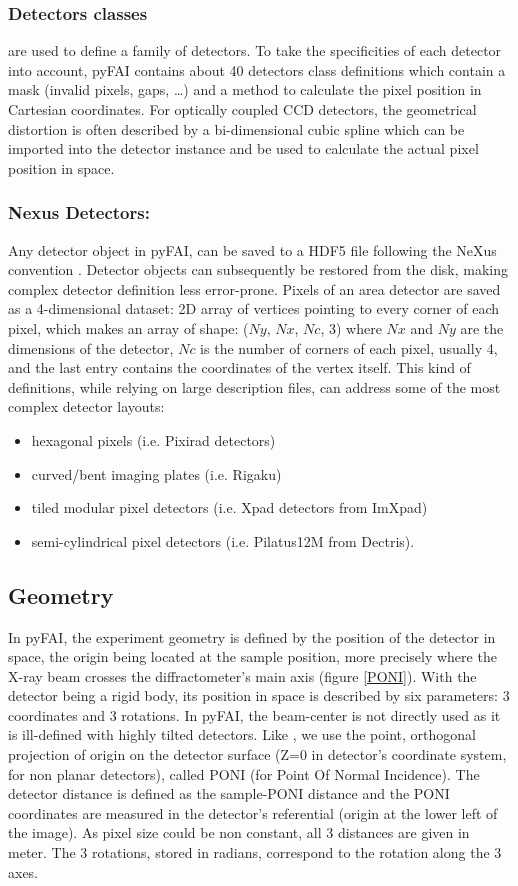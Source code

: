 \documentclass[preprint]{iucr}
\begin{document}
\subsubsection{Detectors classes} are used to define a family of detectors.
To take the specificities of each detector into account, pyFAI contains about
40 detectors class definitions which contain a mask (invalid pixels,
gaps, \ldots) and a method to calculate the pixel position in Cartesian coordinates.
For optically coupled CCD detectors, the geometrical distortion is often
described by a bi-dimensional cubic spline which can be imported into
the detector instance and be used to calculate the actual pixel position in space.

\subsubsection{Nexus Detectors:}
Any detector object in pyFAI, can be saved to a HDF5 file following the NeXus
 convention \cite{nexus}.
Detector objects can subsequently be restored from the disk, making
complex detector definition less error-prone.
Pixels of an area detector are saved as a 4-dimensional dataset: 2D
array of vertices pointing to every corner of each pixel, which makes an array
of shape: ($Ny$, $Nx$, $Nc$, 3) where $Nx$ and $Ny$ are the dimensions of the
detector, $Nc$ is the number of corners of each pixel, usually 4, and the last
entry contains the coordinates of the vertex itself.
This kind of definitions, while relying on large description files,
can address some of the most complex detector layouts:
\begin{itemize}
  \item hexagonal pixels (i.e. Pixirad detectors)
  \item curved/bent imaging plates (i.e. Rigaku)
  \item tiled modular pixel detectors (i.e. Xpad detectors from ImXpad)
  \item semi-cylindrical pixel detectors (i.e. Pilatus12M from Dectris).
\end{itemize}

\subsection{Geometry}
In pyFAI, the experiment geometry is defined by the position of the detector in
space, the origin being located at the sample position, more precisely where the
X-ray beam crosses the diffractometer's main axis (figure \ref{PONI}).
With the detector being a rigid body, its position in space is described by
six parameters: 3 coordinates and 3 rotations.
In pyFAI, the beam-center is not directly used as it is ill-defined with
highly tilted detectors.  
Like \cite{spd}, we use  the point, orthogonal projection of origin on
the detector surface (Z=0 in detector's coordinate system, for non planar detectors), 
called PONI (for Point Of Normal Incidence).
The detector distance is defined as the sample-PONI distance
and the PONI coordinates are measured in the detector's referential (origin at the lower
left of the image). As pixel size could be non constant, all 3 distances are
given in meter.
The 3 rotations, stored in radians, correspond to the rotation along the 3
axes.
\end{document}
